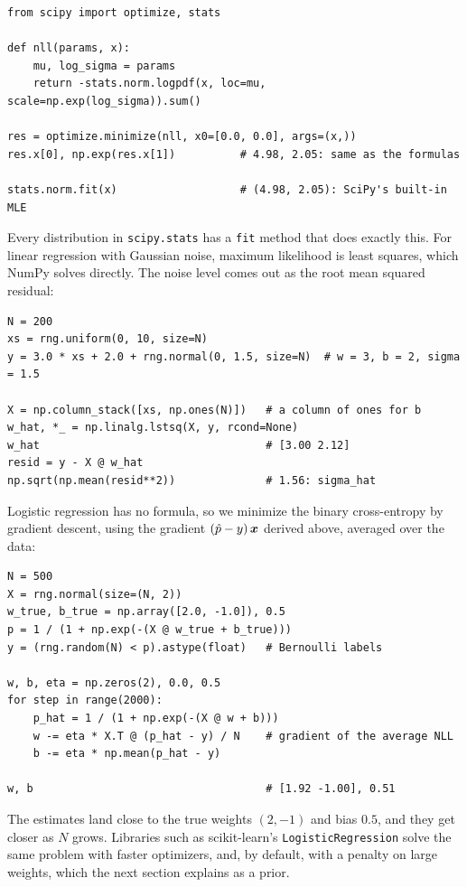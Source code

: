 \begin{lstlisting}
from scipy import optimize, stats

def nll(params, x):
    mu, log_sigma = params
    return -stats.norm.logpdf(x, loc=mu, scale=np.exp(log_sigma)).sum()

res = optimize.minimize(nll, x0=[0.0, 0.0], args=(x,))
res.x[0], np.exp(res.x[1])          # 4.98, 2.05: same as the formulas

stats.norm.fit(x)                   # (4.98, 2.05): SciPy's built-in MLE
\end{lstlisting}

Every distribution in \texttt{scipy.stats} has a \texttt{fit} method
that does exactly this. For linear regression with Gaussian noise,
maximum likelihood is least squares, which NumPy solves directly. The
noise level comes out as the root mean squared residual:

\begin{lstlisting}
N = 200
xs = rng.uniform(0, 10, size=N)
y = 3.0 * xs + 2.0 + rng.normal(0, 1.5, size=N)  # w = 3, b = 2, sigma = 1.5

X = np.column_stack([xs, np.ones(N)])   # a column of ones for b
w_hat, *_ = np.linalg.lstsq(X, y, rcond=None)
w_hat                                   # [3.00 2.12]
resid = y - X @ w_hat
np.sqrt(np.mean(resid**2))              # 1.56: sigma_hat
\end{lstlisting}

Logistic regression has no formula, so we minimize the binary
cross-entropy by gradient descent, using the gradient $(\hat{p} -
y)\,\bm{x}$ derived above, averaged over the data:

\begin{lstlisting}
N = 500
X = rng.normal(size=(N, 2))
w_true, b_true = np.array([2.0, -1.0]), 0.5
p = 1 / (1 + np.exp(-(X @ w_true + b_true)))
y = (rng.random(N) < p).astype(float)   # Bernoulli labels

w, b, eta = np.zeros(2), 0.0, 0.5
for step in range(2000):
    p_hat = 1 / (1 + np.exp(-(X @ w + b)))
    w -= eta * X.T @ (p_hat - y) / N    # gradient of the average NLL
    b -= eta * np.mean(p_hat - y)

w, b                                    # [1.92 -1.00], 0.51
\end{lstlisting}

The estimates land close to the true weights $(2, -1)$ and bias $0.5$,
and they get closer as $N$ grows. Libraries such as scikit-learn's
\texttt{LogisticRegression} solve the same problem with faster
optimizers, and, by default, with a penalty on large weights, which the
next section explains as a prior.


